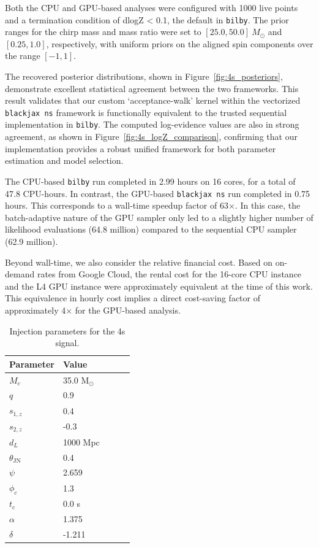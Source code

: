\documentclass[fleqn,usenatbib]{mnras}
\begin{document}
Both the CPU and GPU-based analyses were configured with 1000 live
points and a termination condition of dlogZ < 0.1, the default in \texttt{bilby}. The prior ranges
for the chirp mass and mass ratio were set to $[25.0, 50.0]~M_{\odot}$
and $[0.25, 1.0]$, respectively, with uniform priors on the aligned
spin components over the range $[-1, 1]$. 

The recovered posterior distributions, shown in
Figure~\ref{fig:4s_posteriors}, demonstrate excellent statistical
agreement between the two frameworks. This result validates that our
custom `acceptance-walk' kernel within the vectorized \texttt{blackjax ns}
framework is functionally equivalent to the trusted sequential
implementation in \texttt{bilby}. The computed log-evidence values are
also in strong agreement, as shown in Figure~\ref{fig:4s_logZ_comparison},
confirming that our implementation provides a robust unified framework for both
parameter estimation and model selection.

The CPU-based \texttt{bilby} run completed in 2.99 hours on 16 cores, for a total of
47.8 CPU-hours. In contrast, the GPU-based \texttt{blackjax ns} run
completed in 0.75 hours. This corresponds to a wall-time speedup factor
of 63$\times$. In this case, the batch-adaptive nature of the GPU
sampler only led to a slightly higher number of likelihood evaluations
(64.8 million) compared to the sequential CPU sampler (62.9 million).

Beyond wall-time, we also consider the relative financial cost. Based
on on-demand rates from Google Cloud, the rental cost for the 16-core
CPU instance and the L4 GPU instance were approximately equivalent at
the time of this work. This equivalence in hourly cost implies a direct
cost-saving factor of approximately 4$\times$ for the GPU-based analysis.


\begin{table}
    \centering
    \caption{Injection parameters for the 4s signal.}
    \label{tab:injection_params}
    \begin{tabular}{l l l c c}
    \hline
    \hline
    \textbf{Parameter} & \textbf{Value} \\
    \hline
    $M_c$ & 35.0 M$_{\odot}$ \\
    $q$ & 0.9 \\
    $s_{1,z}$ & 0.4 \\
    $s_{2,z}$ & -0.3 \\
    $d_L$ & 1000 Mpc \\
    $\theta_{\textrm{JN}}$ & 0.4 \\
    $\psi$ & 2.659 \\
    $\phi_c$ & 1.3 \\
    $t_c$ & 0.0 s\\
    $\alpha$ & 1.375 \\
    $\delta$ & -1.211 \\
    \hline
    \hline
    \end{tabular}
    \end{table}
\end{document}
